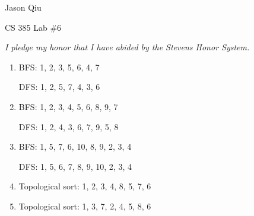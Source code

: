 \documentclass[a4paper,10pt]{article}
\begin{document}
Jason Qiu

CS 385 Lab $\#6$

\emph{I pledge my honor that I have abided by the Stevens Honor System.}

\begin{enumerate}[1.]
\item BFS: 1, 2, 3, 5, 6, 4, 7

DFS: 1, 2, 5, 7, 4, 3, 6

\item BFS: 1, 2, 3, 4, 5, 6, 8, 9, 7

DFS: 1, 2, 4, 3, 6, 7, 9, 5, 8

\item BFS: 1, 5, 7, 6, 10, 8, 9, 2, 3, 4

DFS: 1, 5, 6, 7, 8, 9, 10, 2, 3, 4

\item Topological sort: 1, 2, 3, 4, 8, 5, 7, 6
\item Topological sort: 1, 3, 7, 2, 4, 5, 8, 6
\end{enumerate}
\end{document}
